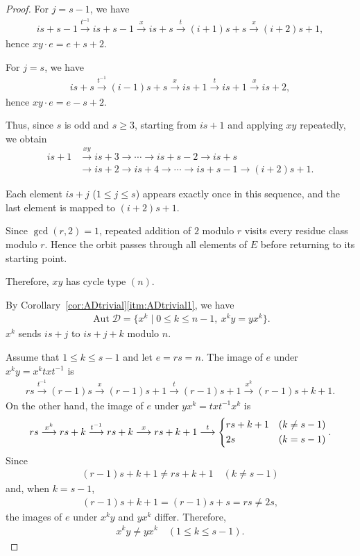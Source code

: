 \documentclass[12pt,reqno]{amsart}
\newcommand{\msD}{\mathscr{D}}
\newcommand{\HL}{\vspace{2mm}}							%
\newcommand{\q}{\quad}									%
\newcommand{\onarrow}[1]{\overset{#1}{\longrightarrow}}			%
\DeclareMathOperator{\Aut}{Aut}							%
\theoremstyle{mythmstyle}
\theoremstyle{mydefstyle}
\newcommand{\corref}[1]{Corollary~\ref{#1}}
\newcommand{\AD}{\Aut{\msD}}
\numberwithin{equation}{section}
\begin{document}
\begin{proof}
For $j = s-1$, we have
\begin{align}
is+s-1 \onarrow{t^{-1}} is+s-1 \onarrow{x} is+s \onarrow{t} (i+1)s+s \onarrow{x} (i+2)s+1,
\end{align}
hence $xy\cdot e = e+s+2$.

For $j = s$, we have
\begin{align}
is+s \onarrow{t^{-1}} (i-1)s+s \onarrow{x} is+1 \onarrow{t} is+1 \onarrow{x} is+2,
\end{align}
hence $xy\cdot e = e-s+2$.

Thus, since $s$ is odd and $s \ge 3$, starting from $is+1$ and applying $xy$
repeatedly, we obtain
\begin{align}
is+1 &\onarrow{xy} is+3 \rightarrow \cdots \rightarrow is+s-2 \rightarrow is+s \\
&\rightarrow is+2 \rightarrow is+4 \rightarrow \cdots \rightarrow is+s-1 \rightarrow (i+2)s+1.
\end{align}

Each element $is+j$ ($1\le j\le s$) appears exactly once in this sequence,
and the last element is mapped to $(i+2)s+1$.

Since $\gcd(r,2)=1$, repeated addition of $2$ modulo $r$
visits every residue class modulo $r$.
Hence the orbit passes through all elements of $E$
before returning to its starting point.

Therefore, $xy$ has cycle type $(n)$.
\HL

\item[\ref{itm:c1AD}]
By \corref{cor:ADtrivial}\ref{itm:ADtrivial1}, we have
\begin{align}
\label{eq:ADset}
\AD = \{ x^{k} \mid 0 \le k \le n-1,\ x^{k}y = yx^{k} \}.
\end{align}
$x^{k}$ sends $is+j$ to $is+j+k$ modulo $n$.

Assume that $1 \le k \le s-1$ and let $e = rs = n$. The image of $e$ under $x^{k} y=x^{k}txt^{-1}$ is
\begin{align}
rs \onarrow{t^{-1}} (r-1)s \onarrow{x} (r-1)s+1 \onarrow{t} (r-1)s+1 \onarrow{x^{k}} (r-1)s+k+1.
\end{align}
On the other hand, the image of $e$ under $yx^{k} = txt^{-1}x^{k}$ is
\begin{align}
rs \onarrow{x^{k}} rs+k  \onarrow{t^{-1}} rs+k \onarrow{x} rs+k+1 \onarrow{t}
\begin{dcases}
rs+k+1 & (k \ne s-1) \\
2s & (k = s-1)
\end{dcases}.
\end{align}
Since
\begin{align}
(r-1)s+k+1 \ne rs+k+1 \q (k \ne s-1)
\end{align}
and, when $k = s-1$,
\begin{align}
(r-1)s+k+1=(r-1)s+s=rs \ne 2s,
\end{align}
the images of $e$ under $x^{k}y$ and $yx^{k}$ differ. 
Therefore,
\begin{align}
\label{eq:xky1}
x^{k}y \ne yx^{k} \q (1 \le k \le s-1).
\end{align}


\end{proof}
\end{document}
